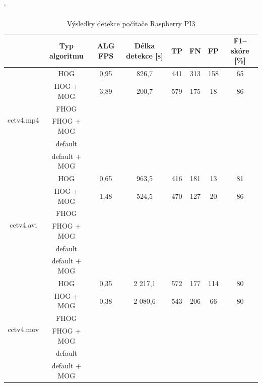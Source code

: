 \begin{table}[H]
\catcode`
\centering
\caption{Výsledky detekce počítače Raspberry PI3}
\label{resultTabRPI3}
\begin{tabular}{|c|c|c|c|c|c|c|c|}
\hline
                         & Typ algoritmu 	& ALG FPS & Délka detekce [s] & TP 		& FN 	& FP 	& F1--skóre [\%] \\ \hline
\multirow{6}{*}{cctv4.mp4} & HOG         	&   0,95  &   826,7       	  & 441   	& 313   & 158   &   65      	\\ \cline{2-8} 
                         & HOG + MOG  		&   3,89  &   200,7       	  & 579		& 175  	& 18   	& 	86	        \\ \cline{2-8} 
                         & FHOG       		&         &   			  &    		&    	&    	& 		        \\ \cline{2-8} 
                         & FHOG + MOG 		&         &               	  &    		&    	&    	& 		        \\ \cline{2-8} 
                         & default	 		&         &               	  &    		&    	&    	& 		        \\ \cline{2-8} 
                         & default + MOG 	&               	  &    		&    	&    	& 		&        \\ \hline\hline 
\multirow{6}{*}{cctv4.avi} & HOG      		&   0,65  &   963,5        	  & 416   	& 181 	& 13    & 	81	        \\ \cline{2-8} 
                       & HOG + MOG  		&   1,48  &   524,5       	  & 470		& 127 	& 20   	& 	86	        \\ \cline{2-8} 
                         & FHOG       		&         &               	  &    		&    	&    	& 		        \\ \cline{2-8} 
                         & FHOG + MOG 		&         &               	  &    		&    	&    	& 		        \\ \cline{2-8} 
                         & default	 		&         &               	  &    		&    	&    	& 		        \\ \cline{2-8} 
                         & default + MOG 	&         &               	  &    		&    	&    	& 		        \\ \hline \hline
\multirow{6}{*}{cctv4.mov} & HOG      		&   0,35  &   2 217,1      	  & 572 	& 177 	& 114  	& 	80	        \\ \cline{2-8} 
                         & HOG + MOG  		&   0,38  &   2 080,6      	  & 543		& 206  	& 66	& 	80	        \\ \cline{2-8} 
                         & FHOG       		&         &               	  &    		&    	&    	& 		        \\ \cline{2-8} 
                         & FHOG + MOG 		&         &               	  &    		&    	&    	& 		        \\ \cline{2-8} 
                         & default	 		&         &               	  &    		&    	&    	& 		        \\ \cline{2-8} 
                         & default + MOG 	&         &               	  &    		&    	&    	& 		        \\ \hline
\end{tabular}
\end{table}


